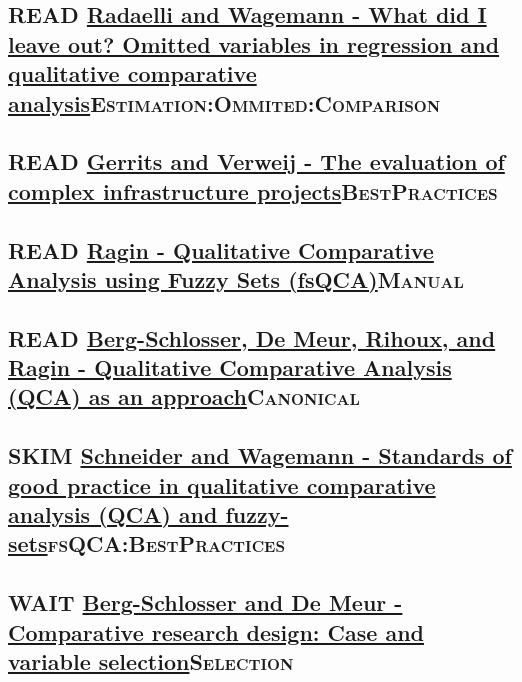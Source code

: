 \documentclass[11pt]{article}
\begin{document}
\subsection*{{\bfseries\sffamily READ} \href{https://doi.org/10.1057/s41304-017-0142-7}{Radaelli and Wagemann -  What did I leave out? Omitted variables in regression and qualitative comparative analysis}\hfill{}\textsc{Estimation:Ommited:Comparison}}
\label{sec:org46f76a2}

\subsection*{{\bfseries\sffamily READ} \href{https://stefanverweij.eu/wp-content/uploads/2018/09/2018-Edward-Elgar-Gerrits-Verweij.pdf}{Gerrits and Verweij - The evaluation of complex infrastructure projects}\hfill{}\textsc{BestPractices}}
\label{sec:org5d79f3f}
\subsection*{{\bfseries\sffamily READ} \href{https://dx.doi.org/10.4135/9781452226569.n5}{Ragin - Qualitative Comparative Analysis using Fuzzy Sets (fsQCA)}\hfill{}\textsc{Manual}}
\label{sec:orgb0fa0f8}

\subsection*{{\bfseries\sffamily READ} \href{https://us.sagepub.com/sites/default/files/upm-assets/23236\_book\_item\_23236.pdf}{Berg-Schlosser, De Meur, Rihoux, and Ragin - Qualitative Comparative Analysis (QCA) as an approach}\hfill{}\textsc{Canonical}}
\label{sec:org7e54ec2}
\subsection*{{\bfseries\sffamily SKIM} \href{https://www.researchgate.net/deref/http\%3A\%2F\%2Fdx.doi.org\%2F10.1163\%2F156913210X12493538729793}{Schneider and Wagemann - Standards of good practice in qualitative comparative analysis (QCA) and fuzzy-sets}\hfill{}\textsc{fsQCA:BestPractices}}
\label{sec:org441c3c5}

\subsection*{{\bfseries\sffamily WAIT} \href{https://dx.doi.org/10.4135/9781452226569.n2}{Berg-Schlosser and De Meur - Comparative research design: Case and variable selection}\hfill{}\textsc{Selection}}
\label{sec:orgb583f7f}
\end{document}
